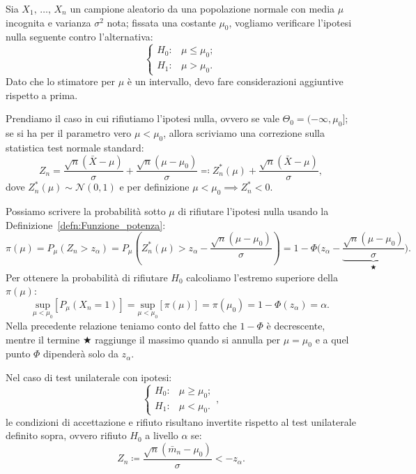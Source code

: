             \begin{defn}[Unilaterale]
                Sia $X_1,\, \ldots,\, X_{n}$ un campione aleatorio da una popolazione normale con media $\mu$ 
                incognita e varianza $\sigma^2$ nota; fissata una costante $\mu_0$, vogliamo verificare 
                l’ipotesi nulla seguente contro l’alternativa: \[
                \begin{cases}
                    H_0 : & \mu \leq \mu_0; \\
                    H_1 : & \mu > \mu_0.
                \end{cases}
                \] Dato che lo stimatore per $\mu$ è un intervallo, devo fare considerazioni aggiuntive rispetto a prima.

                Prendiamo il caso in cui rifiutiamo l'ipotesi nulla, ovvero se vale $\Theta_0 = (-\infty,\mu_0]$; 
                se si ha per il parametro vero $\mu < \mu_0$, allora scriviamo una correzione sulla 
                statistica test normale standard: \[
                Z_n = \frac{\sqrt{n}(\bar{X} - \mu)}{\sigma} + \frac{\sqrt{n}(\mu - \mu_0)}{\sigma} 
                \eqqcolon Z_n^{\ast}(\mu) + \frac{\sqrt{n}(\bar{X} - \mu)}{\sigma}
                ,\] dove $Z_n^{\ast}(\mu) \sim \mathcal{N}(0,1)$ e per definizione $\mu < \mu_0 \implies Z_n^{\ast} < 0$.

                Possiamo scrivere la probabilità sotto $\mu$ di rifiutare l'ipotesi nulla usando la 
                Definizione~\ref{defn:Funzione_potenza}: \[
                \pi(\mu) = P_{\mu}\left(Z_n > z_{\alpha}\right) = 
                P_{\mu}\left(Z_n^{\ast}(\mu) > z_{\alpha}-\frac{\sqrt{n}(\mu-\mu_0)}{\sigma}\right) = 
                1-\Phi\bigg(z_{\alpha}-\underset{\bigstar}{\underbrace{\frac{\sqrt{n}(\mu-\mu_0)}{\sigma}}}\bigg)
                .\] Per ottenere la probabilità di rifiutare $H_0$ calcoliamo l'estremo superiore della $\pi(\mu)$: \[
                \underset{\mu<\mu_0}{\text{sup}}\left[P_{\mu} \left(X_n = 1\right)\right] = 
                \underset{\mu<\mu_0}{\text{sup}}\left[ \pi(\mu) \right] = \pi(\mu_0) = 1 - \Phi(z_{\alpha}) = \alpha
                .\] Nella precedente relazione teniamo conto del fatto che $1-\Phi$ è decrescente, mentre il termine $\bigstar$ raggiunge il massimo quando si annulla per $\mu=\mu_0$ e a quel punto $\Phi$ dipenderà solo da $z_{\alpha}$.
            \end{defn}
            \begin{obsv}
                Nel caso di test unilaterale con ipotesi: \[
                    \begin{cases}
                        H_0 : & \mu \geq \mu_0; \\
                        H_1 : & \mu < \mu_0.
                    \end{cases}
                ,\] le condizioni di accettazione e rifiuto risultano invertite rispetto al test unilaterale 
                definito sopra, ovvero rifiuto $H_0$ a livello $\alpha$ se: \[
                Z_n \coloneqq \frac{\sqrt{n}(\bar{m}_n - \mu_0)}{\sigma} < -z_{\alpha}
                .\] 
            \end{obsv}
